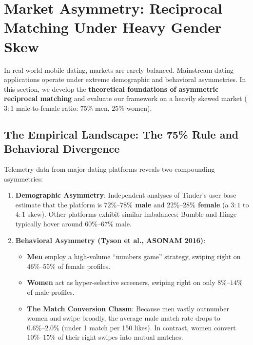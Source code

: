 \documentclass[11pt,letterpaper]{article}
\theoremstyle{definition}
\theoremstyle{plain}
\theoremstyle{remark}
\begin{document}
\newpage
\section{Market Asymmetry: Reciprocal Matching Under Heavy Gender Skew}
\label{sec:skewed_markets}

In real-world mobile dating, markets are rarely balanced. Mainstream dating applications operate under extreme demographic and behavioral asymmetries. In this section, we develop the \textbf{theoretical foundations of asymmetric reciprocal matching} and evaluate our framework on a heavily skewed market ($3:1$ male-to-female ratio: $75\%$ men, $25\%$ women).

\subsection{The Empirical Landscape: The 75\% Rule and Behavioral Divergence}
Telemetry data from major dating platforms reveals two compounding asymmetries:
\begin{enumerate}[leftmargin=2em]
    \item \textbf{Demographic Asymmetry}: Independent analyses of Tinder's user base estimate that the platform is \textbf{$72\%\text{--}78\%$ male} and \textbf{$22\%\text{--}28\%$ female} (a $3:1$ to $4:1$ skew). Other platforms exhibit similar imbalances: Bumble and Hinge typically hover around $60\%\text{--}67\%$ male.
    \item \textbf{Behavioral Asymmetry (Tyson et al., ASONAM 2016)}:
    \begin{itemize}
        \item \textbf{Men} employ a high-volume ``numbers game'' strategy, swiping right on \textbf{$46\%\text{--}55\%$} of female profiles.
        \item \textbf{Women} act as hyper-selective screeners, swiping right on only \textbf{$8\%\text{--}14\%$} of male profiles.
        \item \textbf{The Match Conversion Chasm}: Because men vastly outnumber women and swipe broadly, the average male match rate drops to \textbf{$0.6\%\text{--}2.0\%$} (under 1 match per 150 likes). In contrast, women convert \textbf{$10\%\text{--}15\%$} of their right swipes into mutual matches.
    \end{itemize}
\end{enumerate}
\end{document}
